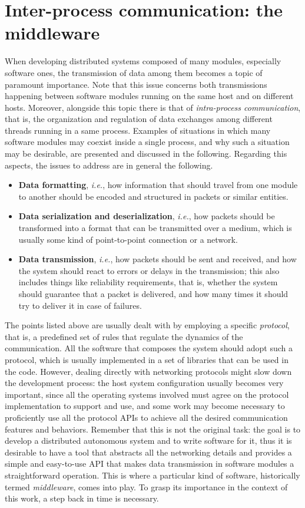 \section{Inter-process communication: the middleware}
\label{sec:middleware}
When developing distributed systems composed of many modules, especially software ones, the transmission of data among them becomes a topic of paramount importance. Note that this issue concerns both transmissions happening between software modules running on the same host and on different hosts. Moreover, alongside this topic there is that of \emph{intra-process communication}, that is, the organization and regulation of data exchanges among different threads running in a same process. Examples of situations in which many software modules may coexist inside a single process, and why such a situation may be desirable, are presented and discussed in the following. Regarding this aspects, the issues to address are in general the following.
\begin{itemize}
  \item \textbf{Data formatting}, \emph{i.e.}, how information that should travel from one module to another should be encoded and structured in packets or similar entities.
  \item \textbf{Data serialization and deserialization}, \emph{i.e.}, how packets should be transformed into a format that can be transmitted over a medium, which is usually some kind of point-to-point connection or a network.
  \item \textbf{Data transmission}, \emph{i.e.}, how packets should be sent and received, and how the system should react to errors or delays in the transmission; this also includes things like reliability requirements, that is, whether the system should guarantee that a packet is delivered, and how many times it should try to deliver it in case of failures.
\end{itemize}
The points listed above are usually dealt with by employing a specific \emph{protocol}, that is, a predefined set of rules that regulate the dynamics of the communication. All the software that composes the system should adopt such a protocol, which is usually implemented in a set of libraries that can be used in the code. However, dealing directly with networking protocols might slow down the development process: the host system configuration usually becomes very important, since all the operating systems involved must agree on the protocol implementation to support and use, and some work may become necessary to proficiently use all the protocol APIs to achieve all the desired communication features and behaviors. Remember that this is not the original task: the goal is to develop a distributed autonomous system and to write software for it, thus it is desirable to have a tool that abstracts all the networking details and provides a simple and easy-to-use API that makes data transmission in software modules a straightforward operation. This is where a particular kind of software, historically termed \emph{middleware}, comes into play. To grasp its importance in the context of this work, a step back in time is necessary.

